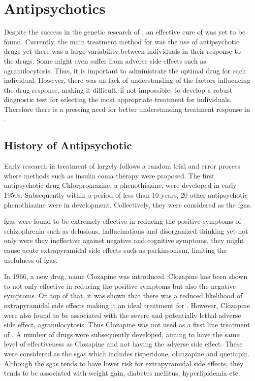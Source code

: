 \documentclass[12pt]{book}
\newcommand*{\glng}{\glsentrylong}
\begin{document}
	\section{Antipsychotics}
	Despite the success in the genetic research of \glng{scz}, an effective cure of \glng{scz} was yet to be found.
	Currently, the main treatment method for \glng{scz} was the use of antipsychotic drugs yet there was a large variability between individuals in their response to the drugs.
	Some might even suffer from adverse side effects such as agranulocytosis.
	Thus, it is important to administrate the optimal drug for each individual.
	However, there was an lack of understanding of the factors influencing the drug response, making it difficult, if not impossible, to develop a robust diagnostic test for selecting the most appropriate treatment for individuals.
	Therefore there is a pressing need for better understanding treatment response in \glng{scz}.
	
	\subsection{History of Antipsychotic}
	Early research in treatment of \glng{scz} largely follows a random trial and error process where methods such as insulin coma therapy were proposed\citep{Lehmann1997}.
	The first antipsychotic drug Chlorpromazine, a phenothiazine, were developed in early 1950s.
	Subsequently within a period of less than 10 years, 20 other antipsychotic phenothiazine were in development.
	Collectively, they were considered as the \glspl{fga}.
	
	\glspl{fga} were found to be extremely effective in reducing the positive symptoms of schizophrenia such as delusions, hallucinations and disorganized thinking yet not only were they ineffective against negative and cognitive symptoms, they might cause acute extrapyramidal side effects such as parkinsonism, limiting the usefulness of \glspl{fga}\citep{Tandon2007}.
	
	In 1966, a new drug, name Clozapine was introduced\citep{Lehmann1997}. 
	Clozapine has been shown to not only effective in reducing the positive symptoms but also the negative symptoms. 
	On top of that, it was shown that there was a reduced likelihood of extrapyramidal side effects\citep{Lehmann1997} making it an ideal treatment for \glng{scz}.
	However, Clozapine were also found to be associated with the severe and potentially lethal adverse side effect, agranulocytosis\citep{Alvir1993}.	
	Thus Clozapine was not used as a first line treatment of \glng{scz}\citep{Lieberman1996}.
	A number of drugs were subsequently developed, aiming to have the same level of effectiveness as Clozapine and not having the adverse side effect.
	These were considered as the \glspl{sga} which includes risperidone, olanzapine and quetiapin.
	Although the \glspl{sga} tends to have lower risk for extrapyramidal side effects, they tends to be associated with weight gain, diabetes mellitus, hyperlipidemia etc.\citep{UCOK2008}
	
\end{document}
